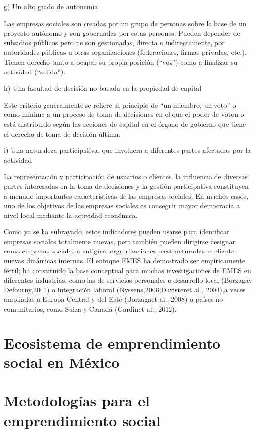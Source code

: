 \documentclass{memoir}
\begin{document}
g)  Un  alto   grado de  autonomía 

Las   empresas sociales son   creadas por   un  grupo de  personas sobre la base de  un  proyecto autónomo y son   gobernadas por   estas personas. Pueden depender de  subsidios públicos pero no  son   gestionadas, directa o indirectamente, por   autoridades públicas u otras organizaciones (federaciones, firmas privadas, etc.). Tienen derecho tanto a ocupar su propia posición (“voz”) como a finalizar su actividad (“salida”).

h)  Una facultad de  decisión no  basada en  la propiedad de  capital

Este criterio generalmente se  refiere al  principio de  “un  miembro, un  voto” o como mínimo a un proceso de  toma de  decisiones en  el  que   el  poder de  voton o  está distribuido según las  acciones de capital en  el  órgano de  gobierno que   tiene el  derecho de  toma de  decisión última.

i)  Una naturaleza participativa, que   involucra a diferentes partes afectadas por   la actividad  

La  representación y participación de  usuarios o clientes, la influencia de  diversas partes interesadas en  la toma de  decisiones y  la gestión participativa constituyen a menudo importantes características de  las  empresas sociales. En  muchos casos, uno   de  los  objetivos de  las  empresas sociales es   conseguir mayor democracia a nivel local mediante la actividad económica.


Como ya  se  ha  subrayado, estos indicadores pueden usarse para identificar empresas sociales totalmente nuevas, pero también pueden dirigirse designar como empresas sociales a antiguas orga-nizaciones reestructuradas mediante nuevas dinámicas internas. El  enfoque EMES ha  demostrado ser   empíricamente fértil; ha  constituido la base conceptual para muchas investigaciones de  EMES en  diferentes industrias, como las  de  servicios personales o desarrollo local (Borzagay Defourny,2001) o integración laboral (Nyssens,2006;Davisteret  al.,   2004),a veces ampliadas a Europa Central y del Este (Borzagaet  al.,   2008) o países no  comunitarios, como Suiza y Canadá (Gardinet  al.,   2012).


\section{Ecosistema de emprendimiento social en México}
\label{sec:orgae6e1e4}


\section{Metodologías para el emprendimiento social}
\label{sec:org8c7816c}
\end{document}
